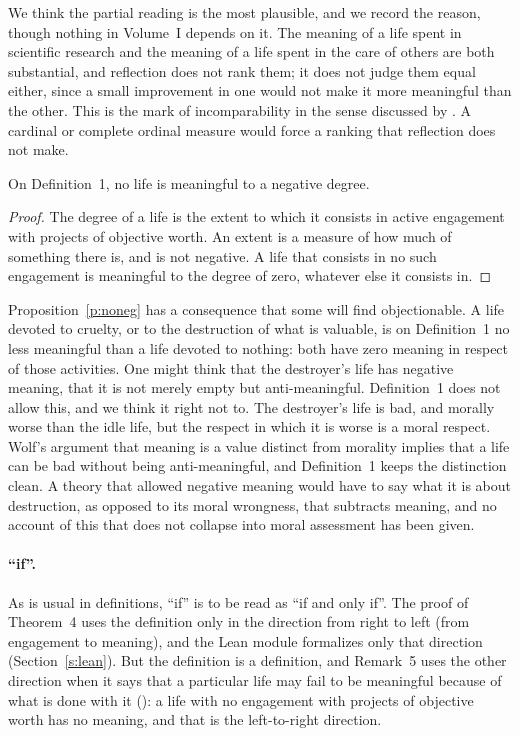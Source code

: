 We think the partial reading is the most plausible, and we record the reason, though nothing in Volume~I depends on it. The meaning of a life spent in scientific research and the meaning of a life spent in the care of others are both substantial, and reflection does not rank them; it does not judge them equal either, since a small improvement in one would not make it more meaningful than the other. This is the mark of incomparability in the sense discussed by \citet{Raz1986}. A cardinal or complete ordinal measure would force a ranking that reflection does not make.

\begin{proposition}\label{p:noneg}
On Definition~1, no life is meaningful to a negative degree.
\end{proposition}

\begin{proof}
The degree of a life is the extent to which it consists in active engagement with projects of objective worth. An extent is a measure of how much of something there is, and is not negative. A life that consists in no such engagement is meaningful to the degree of zero, whatever else it consists in.
\end{proof}

Proposition~\ref{p:noneg} has a consequence that some will find objectionable. A life devoted to cruelty, or to the destruction of what is valuable, is on Definition~1 no less meaningful than a life devoted to nothing: both have zero meaning in respect of those activities. One might think that the destroyer's life has negative meaning, that it is not merely empty but anti-meaningful. Definition~1 does not allow this, and we think it right not to. The destroyer's life is bad, and morally worse than the idle life, but the respect in which it is worse is a moral respect. Wolf's argument that meaning is a value distinct from morality \citep{Wolf1997} implies that a life can be bad without being anti-meaningful, and Definition~1 keeps the distinction clean. A theory that allowed negative meaning would have to say what it is about destruction, as opposed to its moral wrongness, that subtracts meaning, and no account of this that does not collapse into moral assessment has been given.


\paragraph{\enquote{if}.} As is usual in definitions, \enquote{if} is to be read as \enquote{if and only if}. The proof of Theorem~4 uses the definition only in the direction from right to left (from engagement to meaning), and the Lean module formalizes only that direction (Section~\ref{s:lean}). But the definition is a definition, and Remark~5 uses the other direction when it says that a particular life may fail to be meaningful because of what is done with it (): a life with no engagement with projects of objective worth has no meaning, and that is the left-to-right direction.

